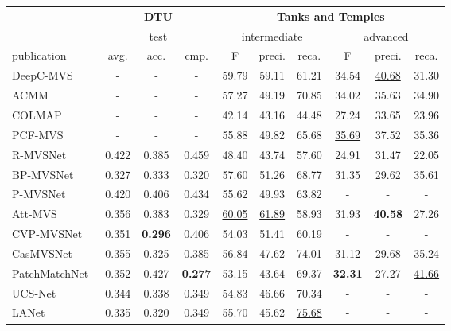 \documentclass{bmvc2k}
\begin{document}
\begin{table}[t]
    \centering
    \setlength{\tabcolsep}{3pt}
    \begin{tabular}{@{}lccccccccc@{}}
    \toprule
    & \multicolumn{3}{c}{\textbf{DTU} \cite{dtu}} & \multicolumn{6}{c}{\textbf{Tanks and Temples} \cite{tanksandtemples}} \\ 
    & \multicolumn{3}{c}{test} & \multicolumn{3}{c}{intermediate} & \multicolumn{3}{c}{advanced}\\ 
    \cmidrule{2-10} 
    publication & avg. & acc. & \multicolumn{1}{c}{cmp.} & F & preci. & \multicolumn{1}{c}{reca.} & F & preci. & reca.  \\ \midrule
    DeepC-MVS~\cite{deepcmvs} & - & - & - & 59.79 & 59.11 & 61.21 & 34.54 & \underline{40.68} & 31.30 \\  
    ACMM~\cite{acmm} & - & - & - & 57.27 & 49.19 & 70.85 & 34.02 & 35.63 & 34.90 \\  
    COLMAP~\cite{colmap_mvs} & - & - & - & 42.14 & 43.16 & 44.48 & 27.24 & 33.65 & 23.96    \\  
    PCF-MVS~\cite{pcf_mvs} & - & - & - & 55.88 & 49.82 & 65.68 & \underline{35.69} & 37.52 & 35.36  \\  
    \hline
    R-MVSNet~\cite{rmvsnet} & 0.422 & 0.385 & 0.459 & 48.40 & 43.74 & 57.60 & 24.91 & 31.47 & 22.05 \\  
    BP-MVSNet~\cite{bp_mvsnet} & 0.327 & 0.333 & 0.320 & 57.60 & 51.26 & 68.77 & 31.35 & 29.62 & 35.61 \\ 
    P-MVSNet~\cite{pmvsnet} & 0.420 & 0.406 & 0.434 & 55.62 & 49.93 & 63.82 & - & - & -   \\  
    Att-MVS~\cite{attmvsnet} & 0.356 & 0.383 & 0.329 & \underline{60.05} & \underline{61.89} & 58.93 & 31.93 & \textbf{40.58} & 27.26  \\  
    CVP-MVSNet~\cite{cvp_mvsnet} & 0.351 & \textbf{0.296} & 0.406 & 54.03 & 51.41 & 60.19 & - & - & -  \\
    CasMVSNet~\cite{casmvs} & 0.355 & 0.325 & 0.385 & 56.84 & 47.62 & 74.01 & 31.12 & 29.68 & 35.24  \\  
    PatchMatchNet~\cite{patchmatchnet} & 0.352 & 0.427 & \textbf{0.277} & 53.15 & 43.64 & 69.37 & \textbf{32.31} & 27.27 & \underline{41.66} \\
    UCS-Net~\cite{ucsnet} & 0.344 & 0.338 & 0.349 & 54.83 & 46.66 & 70.34 & - & - & - \\
    LANet~\cite{lanet} & 0.335 & 0.320 & 0.349 & 55.70 & 45.62 & \underline{75.68} & - & - & - \\

\end{tabular}
\end{table}
\end{document}

